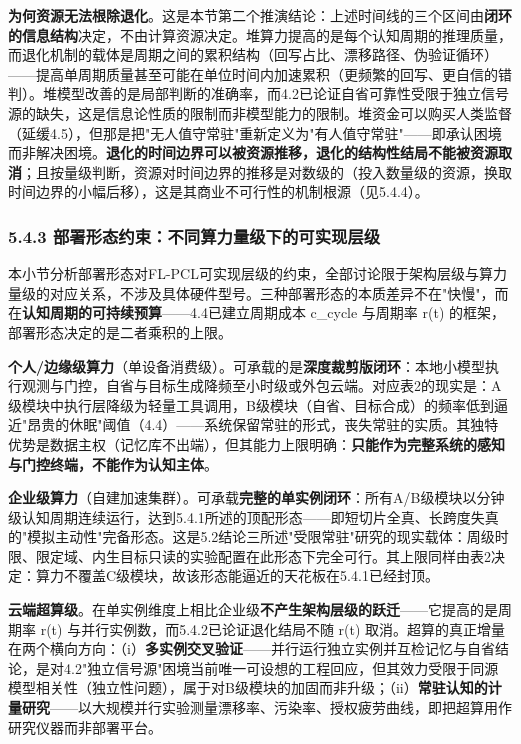 \documentclass[11pt,a4paper]{ctexart}
\begin{document}
\textbf{为何资源无法根除退化}。这是本节第二个推演结论：上述时间线的三个区间由\textbf{闭环的信息结构}决定，不由计算资源决定。堆算力提高的是每个认知周期的推理质量，而退化机制的载体是周期之间的累积结构（回写占比、漂移路径、伪验证循环）——提高单周期质量甚至可能在单位时间内加速累积（更频繁的回写、更自信的错判）。堆模型改善的是局部判断的准确率，而4.2已论证自省可靠性受限于独立信号源的缺失，这是信息论性质的限制而非模型能力的限制。堆资金可以购买人类监督（延缓4.5），但那是把"无人值守常驻"重新定义为"有人值守常驻"——即承认困境而非解决困境。\textbf{退化的时间边界可以被资源推移，退化的结构性结局不能被资源取消}；且按量级判断，资源对时间边界的推移是对数级的（投入数量级的资源，换取时间边界的小幅后移），这是其商业不可行性的机制根源（见5.4.4）。

\subsubsection{5.4.3 部署形态约束：不同算力量级下的可实现层级}

本小节分析部署形态对FL-PCL可实现层级的约束，全部讨论限于架构层级与算力量级的对应关系，不涉及具体硬件型号。三种部署形态的本质差异不在"快慢"，而在\textbf{认知周期的可持续预算}——4.4已建立周期成本 c\_cycle 与周期率 r(t) 的框架，部署形态决定的是二者乘积的上限。

\textbf{个人/边缘级算力}（单设备消费级）。可承载的是\textbf{深度裁剪版闭环}：本地小模型执行观测与门控，自省与目标生成降频至小时级或外包云端。对应表2的现实是：A级模块中执行层降级为轻量工具调用，B级模块（自省、目标合成）的频率低到逼近"昂贵的休眠"阈值（4.4）——系统保留常驻的形式，丧失常驻的实质。其独特优势是数据主权（记忆库不出端），但其能力上限明确：\textbf{只能作为完整系统的感知与门控终端，不能作为认知主体}。

\textbf{企业级算力}（自建加速集群）。可承载\textbf{完整的单实例闭环}：所有A/B级模块以分钟级认知周期连续运行，达到5.4.1所述的顶配形态——即短切片全真、长跨度失真的"模拟主动性"完备形态。这是5.2结论三所述"受限常驻"研究的现实载体：周级时限、限定域、内生目标只读的实验配置在此形态下完全可行。其上限同样由表2决定：算力不覆盖C级模块，故该形态能逼近的天花板在5.4.1已经封顶。

\textbf{云端超算级}。在单实例维度上相比企业级\textbf{不产生架构层级的跃迁}——它提高的是周期率 r(t) 与并行实例数，而5.4.2已论证退化结局不随 r(t) 取消。超算的真正增量在两个横向方向：（i）\textbf{多实例交叉验证}——并行运行独立实例并互检记忆与自省结论，是对4.2"独立信号源"困境当前唯一可设想的工程回应，但其效力受限于同源模型相关性（独立性问题），属于对B级模块的加固而非升级；（ii）\textbf{常驻认知的计量研究}——以大规模并行实验测量漂移率、污染率、授权疲劳曲线，即把超算用作研究仪器而非部署平台。
\end{document}
